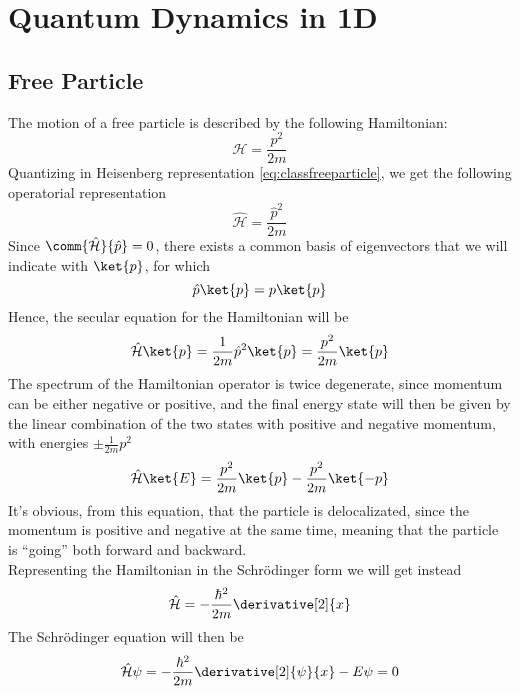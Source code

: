 \documentclass[a4paper, 11pt]{book}
\newcommand{\1}{\opr{\mathds{1}}}
\newcommand{\ham}{\mathcal{H}}
\newcommand{\opr}[1]{\hat{#1}}
\theoremstyle{plain}
\begin{document}
	\chapter{Quantum Dynamics in 1D}
	\section{Free Particle}
	The motion of a free particle is described by the following Hamiltonian:
	\begin{equation}
		\ham=\frac{p^2}{2m}
		\label{eq:classfreeparticle}
	\end{equation}
	Quantizing in Heisenberg representation \eqref{eq:classfreeparticle}, we get the following operatorial representation
	\begin{equation}
		\opr{\ham}=\frac{\opr{p}^2}{2m}
		\label{eq:quantfreeparticle}
	\end{equation}
	Since $\comm{\opr{\ham}}{\opr{p}}=0$, there exists a common basis of eigenvectors that we will indicate with $\ket{p}$, for which
	\begin{equation*}
		\opr{p}\ket{p}=p\ket{p}
	\end{equation*}
	Hence, the secular equation for the Hamiltonian will be
	\begin{equation}
		\opr{\ham}\ket{p}=\frac{1}{2m}\opr{p}^2\ket{p}=\frac{p^2}{2m}\ket{p}
		\label{eq:energylevels}
	\end{equation}
	The spectrum of the Hamiltonian operator is twice degenerate, since momentum can be either negative or positive, and the final energy state will then be given by the linear combination of the two states with positive and negative momentum, with energies $\pm \frac{1}{2m}p^2$
	\begin{equation}
		\opr{\ham}\ket{E}=\frac{p^2}{2m}\ket{p}-\frac{p^2}{2m}\ket{-p}
		\label{eq:freepartenergy}
	\end{equation}
	It's obvious, from this equation, that the particle is delocalizated, since the momentum is positive and negative at the same time, meaning that the particle is ``going'' both forward and backward.\\
	Representing the Hamiltonian in the Schrödinger form we will get instead
	\begin{equation}
		\opr{\ham}=-\frac{\hbar^2}{2m}\derivative[2]{x}
		\label{eq:schrfreepart}
	\end{equation}
	The Schrödinger equation will then be
	\begin{equation}
		\opr{\ham}\psi=-\frac{\hbar^2}{2m}\derivative[2]{\psi}{x}-E\psi=0
		\label{eq:schreqfreepart}
	\end{equation}
\end{document}
